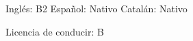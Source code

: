 \documentclass[]{awesome-cv}
\begin{document}
\vspace{-5mm}
\begin{cventries}
	\cventry
	{}
	{}
	{}
	{}
	{\begin{cvsectionnormaltext} 
		\item{Inglés: B2 
        \newline \vspace{1mm} Español: Nativo 
        \newline \vspace{1mm} Catalán: Nativo}
	\end{cvsectionnormaltext}}
	\cventry
	{Licencia de conducir: B}
	{}
	{}
	{}
    {}
\end{cventries}
\end{document}
